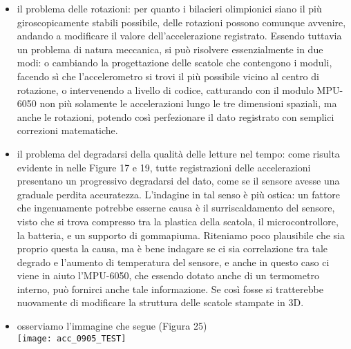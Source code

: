 \documentclass[fleqn,10pt]{SelfArx} %
\begin{document}
\begin{itemize}[noitemsep] %
	\item il problema delle rotazioni: per quanto i bilacieri olimpionici siano il più giroscopicamente stabili possibile, 
	delle rotazioni possono comunque avvenire, andando a modificare il valore dell'accelerazione registrato. Essendo tuttavia 
	un problema di natura meccanica, si può risolvere essenzialmente in due modi: o cambiando la progettazione delle scatole 
	che contengono i moduli, facendo sì che l'accelerometro si trovi il più possibile vicino al centro di rotazione, o 
	intervenendo a livello di codice, catturando con il modulo MPU-6050 non più solamente le accelerazioni lungo le tre 
	dimensioni spaziali, ma anche le rotazioni, potendo così perfezionare il dato registrato con semplici correzioni matematiche.
	\item il problema del degradarsi della qualità delle letture nel tempo: come risulta evidente in nelle Figure 17 e 19, tutte 
	registrazioni delle accelerazioni presentano un progressivo degradarsi del dato, come se il sensore avesse una graduale perdita 
	accuratezza. L'indagine in tal senso è più ostica: un fattore che ingenuamente potrebbe esserne causa è il surriscaldamento del 
	sensore, visto che si trova compresso tra la plastica della scatola, il microcontrollore, la batteria, e un supporto di 
	gommapiuma. Riteniamo poco plausibile che sia proprio questa la causa, ma è bene indagare se ci sia correlazione tra tale degrado 
	e l'aumento di temperatura del sensore, e anche in questo caso ci viene in aiuto l'MPU-6050, che essendo dotato anche di un 
	termometro interno, può fornirci anche tale informazione. Se così fosse si tratterebbe nuovamente di modificare la struttura 
	delle scatole stampate in 3D.
	\item osserviamo l'immagine che segue (Figura 25) \\
	
		\texttt{[image: acc\_0905\_TEST]}


\end{itemize}
\end{document}
